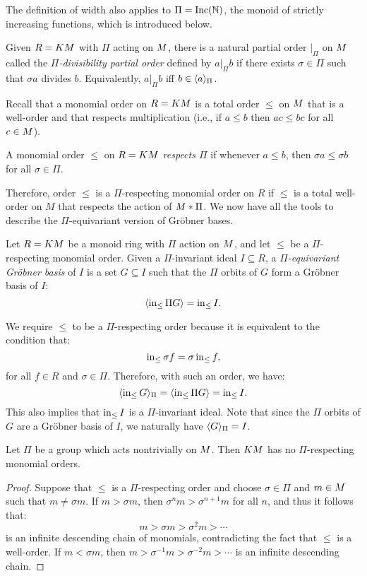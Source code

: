 The definition of width also applies to $\Pi = \operatorname{Inc}(\mathbb N)$, the monoid of strictly increasing functions, which is introduced below.
 
\begin{definition}
 Given $R = KM$ with $\Pi$ acting on $M$, there is a natural partial order $|_\Pi$ on $M$ called the {\em $\Pi$-divisibility partial order} defined by $a |_\Pi b$ if there exists $\sigma \in \Pi$ such that $\sigma a$ divides $b$.  Equivalently, $a |_\Pi b$ iff $b \in \langle a \rangle_\Pi$.
\end{definition}

Recall that a monomial order on $R = KM$ is a total order $\leq$ on $M$ that is a well-order and that respects multiplication (i.e., if $a \leq b$ then $ac \leq bc$ for all $c \in M$).

\begin{definition}
 A monomial order $\leq$ on $R = KM$ {\em respects $\Pi$} if whenever $a \leq b$, then $\sigma a \leq \sigma b$ for all $\sigma \in \Pi$.
\end{definition}

Therefore, order $\leq$ is a $\Pi$-respecting monomial order on $R$ if $\leq$ is a total well-order on $M$ that respects the action of $M*\Pi$.
We now have all the tools to describe the $\Pi$-equivariant version of Gr\"obner bases.
\begin{definition}
 Let $R = KM$ be a monoid ring with $\Pi$ action on $M$, and let $\leq$ be a $\Pi$-respecting monomial order.  Given a $\Pi$-invariant ideal $I \subseteq R$, a {\em $\Pi$-equivariant Gr\"obner basis} of $I$ is a set $G \subseteq I$ such that the $\Pi$ orbits of $G$ form a Gr\"obner basis of $I$:
 \[ \langle \operatorname{in}_{\leq} \Pi G \rangle = \operatorname{in}_{\leq} I. \]
\end{definition}
We require $\leq$ to be a $\Pi$-respecting order because it is equivalent to the condition that:
\[ \operatorname{in}_{\leq} \sigma f = \sigma \operatorname{in}_{\leq} f,\]
for all $f \in R$ and $\sigma \in \Pi$.  Therefore, with such an order, we have:
 \[ \langle \operatorname{in}_{\leq} G \rangle_{\Pi} = \langle \operatorname{in}_{\leq} \Pi G \rangle = \operatorname{in}_{\leq} I. \]
This also implies that $\operatorname{in}_{\leq} I$ is a $\Pi$-invariant ideal.  Note that since the $\Pi$ orbits of $G$ are a Gr\"obner basis of $I$, we naturally have $\langle G \rangle_\Pi = I$.


\begin{proposition}\label{prop:nogroup}
 Let $\Pi$ be a group which acts nontrivially on $M$.  Then $KM$ has no $\Pi$-respecting monomial orders.
\end{proposition}
\begin{proof}
 Suppose that $\leq$ is a $\Pi$-respecting order and choose $\sigma \in \Pi$ and $m \in M$ such that $m \neq \sigma m$.  If $m > \sigma m$, then $\sigma^n m > \sigma^{n+1} m$ for all $n$, and thus it follows that:
  \[ m > \sigma m > \sigma^2 m > \cdots \]
 is an infinite descending chain of monomials, contradicting the fact that $\leq$ is a well-order.  If $m < \sigma m$, then $m > \sigma^{-1} m > \sigma^{-2} m > \cdots$ is an infinite descending chain.
\end{proof}

